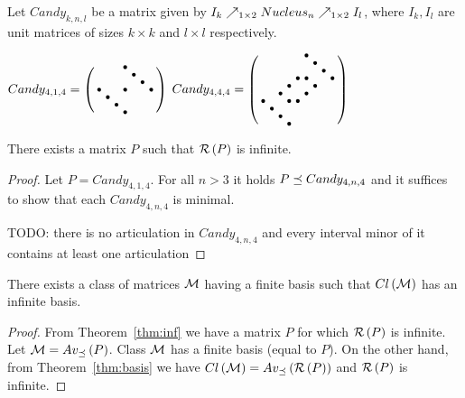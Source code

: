 \begin{defn}
Let $Candy_{k,n,l}$ be a matrix given by $I_k\nearrow_{1\times2}Nucleus_n\nearrow_{1\times2}I_l$, where $I_k,I_l$ are unit matrices of sizes $k\times k$ and $l\times l$ respectively.
\end{defn}
$Candy_{4,1,4}=\left(\begin{smallmatrix}
 & & &\bullet& & & \\
 & & & &\bullet& & \\
 & & & & &\bullet& \\
\bullet& & &\bullet& & &\bullet\\
 &\bullet& & & & & \\
 & &\bullet& & & & \\
 & & &\bullet& & & \end{smallmatrix}\right)$
$Candy_{4,4,4}=\left(\begin{smallmatrix}
 & & & & &\bullet& & & \\
 & & & & & &\bullet& & \\
 & & & & & & &\bullet& \\
 & & & & \bullet&\bullet& & &\bullet\\
 & & &\bullet& & &\bullet& & \\
 & & \bullet& & &\bullet& & & \\
\bullet& & &\bullet&\bullet& & & & \\
 &\bullet& & & & & & & \\
 & &\bullet& & & & & & \\
 & & &\bullet& & & & & \end{smallmatrix}\right)$

\begin{thm}
\label{thm:inf}
There exists a matrix $P$ such that $\mathcal{R}\left(P\right)$ is infinite.
\end{thm}
\begin{proof}
Let $P=Candy_{4,1,4}$. For all $n>3$ it holds $P\preceq Candy_{4,n,4}$ and it suffices to show that each $Candy_{4,n,4}$ is minimal.

TODO: there is no articulation in $Candy_{4,n,4}$ and every interval minor of it contains at least one articulation
\end{proof}

\begin{cor}
There exists a class of matrices $\mathcal{M}$ having a finite basis such that $Cl\left(\mathcal{M}\right)$ has an infinite basis.
\end{cor}
\begin{proof}
From Theorem~\ref{thm:inf} we have a matrix $P$ for which $\mathcal{R}\left(P\right)$ is infinite. Let $\mathcal{M}=Av_{\preceq}\left(P\right)$. Class $\mathcal{M}$ has a finite basis (equal to $P$). On the other hand, from Theorem~\ref{thm:basis} we have $Cl\left(\mathcal{M}\right)=Av_{\preceq}\left(\mathcal{R}\left(P\right)\right)$ and $\mathcal{R}\left(P\right)$ is infinite.
\end{proof}